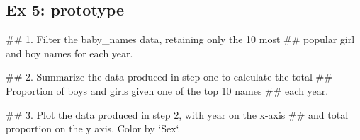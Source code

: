 \documentclass[]{book}
\newenvironment{Shaded}{\begin{snugshade}}{\end{snugshade}}
\newcommand{\KeywordTok}[1]{\textcolor[rgb]{0.13,0.29,0.53}{\textbf{#1}}}
\newcommand{\DataTypeTok}[1]{\textcolor[rgb]{0.13,0.29,0.53}{#1}}
\newcommand{\DecValTok}[1]{\textcolor[rgb]{0.00,0.00,0.81}{#1}}
\newcommand{\StringTok}[1]{\textcolor[rgb]{0.31,0.60,0.02}{#1}}
\newcommand{\CommentTok}[1]{\textcolor[rgb]{0.56,0.35,0.01}{\textit{#1}}}
\newcommand{\OperatorTok}[1]{\textcolor[rgb]{0.81,0.36,0.00}{\textbf{#1}}}
\newcommand{\NormalTok}[1]{#1}
\begin{document}
\subsection{Ex 5: prototype}\label{ex-5-prototype}

\begin{Shaded}
\begin{Highlighting}[]
\NormalTok{## 1.  Filter the baby_names data, retaining only the 10 most }
\NormalTok{##     popular girl and boy names for each year.}
\end{Highlighting}
\end{Shaded}

\begin{Shaded}
\end{Shaded}

\begin{Shaded}
\begin{Highlighting}[]
\NormalTok{## 2.  Summarize the data produced in step one to calculate the total}
\NormalTok{##     Proportion of boys and girls given one of the top 10 names}
\NormalTok{##     each year.}
\end{Highlighting}
\end{Shaded}

\begin{Shaded}
\end{Shaded}

\begin{Shaded}
\begin{Highlighting}[]
\NormalTok{## 3.  Plot the data produced in step 2, with year on the x-axis}
\NormalTok{##     and total proportion on the y axis. Color by `Sex`.}
\end{Highlighting}
\end{Shaded}
\end{document}
